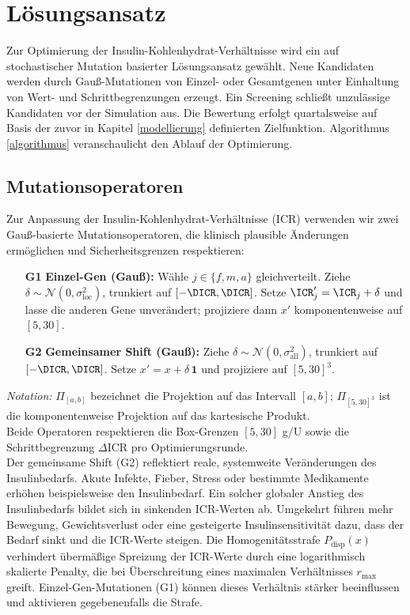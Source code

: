\newcommand{\sigmaall}{\sigma_{\text{all}}}
\newcommand{\sigmaloc}{\sigma_{\text{loc}}}

\section{Lösungsansatz}
Zur Optimierung der Insulin-Kohlenhydrat-Verhältnisse wird ein auf stochastischer Mutation basierter Lösungsansatz gewählt. Neue Kandidaten werden durch Gauß-Mutationen von Einzel- oder Gesamtgenen unter Einhaltung von Wert- und Schrittbegrenzungen erzeugt. Ein Screening schließt unzulässige Kandidaten vor der Simulation aus. Die Bewertung erfolgt quartalsweise auf Basis der zuvor in Kapitel \ref{modellierung} definierten Zielfunktion. Algorithmus \ref{algorithmus} veranschaulicht den Ablauf der Optimierung.

\subsection{Mutationsoperatoren} \label{Mutationsoperatoren}
Zur Anpassung der Insulin-Kohlenhydrat-Verhältnisse (ICR) verwenden wir zwei Gauß-basierte Mutationsoperatoren, die klinisch plausible Änderungen ermöglichen und Sicherheitsgrenzen respektieren:
\begin{itemize}
  \item[\textbf{G1}] \textbf{Einzel-Gen (Gauß):} Wähle \(j\in\{f,m,a\}\) gleichverteilt. Ziehe \(\delta \sim \mathcal N(0,\sigmaloc^{2})\), trunkiert auf \([-\DICR,\DICR]\). Setze \(\ICR'_j=\ICR_j+\delta\) und lasse die anderen Gene unverändert; projiziere dann \(x'\) komponentenweise auf \([5,30]\).
  \item[\textbf{G2}] \textbf{Gemeinsamer Shift (Gauß):} Ziehe \(\delta \sim \mathcal N(0,\sigmaall^{2})\), trunkiert auf \([-\DICR,\DICR]\). Setze \(x' = x + \delta\,\mathbf{1}\) und projiziere auf \([5,30]^3\).
\end{itemize}
\emph{Notation:} \(\Pi_{[a,b]}\) bezeichnet die Projektion auf das Intervall \([a,b]\); \(\Pi_{[5,30]^3}\) ist die komponentenweise Projektion auf das kartesische Produkt.\\
Beide Operatoren respektieren die Box-Grenzen $[5, 30]$ g/U sowie die Schrittbegrenzung $\Delta \text{ICR}$ pro Optimierungsrunde. \\

\noindent Der gemeinsame Shift (G2) reflektiert reale, systemweite Veränderungen des Insulinbedarfs. Akute Infekte, Fieber, Stress oder bestimmte Medikamente erhöhen beispielsweise den Insulinbedarf. Ein solcher globaler Anstieg des Insulinbedarfs bildet sich in sinkenden ICR-Werten ab. Umgekehrt führen mehr Bewegung, Gewichtsverlust oder eine gesteigerte Insulinsensitivität dazu, dass der Bedarf sinkt und die ICR-Werte steigen. Die Homogenitätsstrafe $P_{\text{disp}}(x)$ verhindert übermäßige Spreizung der ICR-Werte durch eine logarithmisch skalierte Penalty, die bei Überschreitung eines maximalen Verhältnisses $r_{\text{max}}$ greift. Einzel-Gen-Mutationen (G1) können dieses Verhältnis stärker beeinflussen und aktivieren gegebenenfalls die Strafe.

